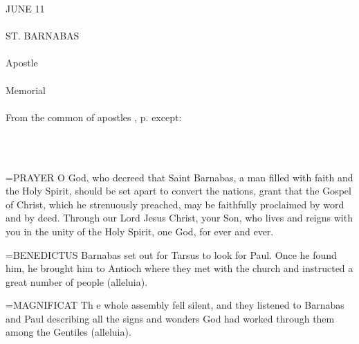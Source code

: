\begin{center}\normalsize \begin{center}\normalsize JUNE 11\\\\
\footnotesize \footnotesize ST. BARNABAS\\\\
\footnotesize \footnotesize Apostle\\\\
\footnotesize \footnotesize Memorial\\\\
\footnotesize \footnotesize From the common of apostles , p.    except:\\\\
\footnotesize \end{center}\\
\end{center}

\hangindent=\parindent \small{PRAYER 
O God, who decreed that Saint Barnabas,
a man filled with faith and the Holy Spirit,
should be set apart to convert the nations,
grant that the Gospel of Christ,
which he strenuously preached,
may be faithfully proclaimed by word and by deed.
Through our Lord Jesus Christ, your Son,
who lives and reigns with you in the unity of the Holy Spirit,
one God, for ever and ever.\\}
 
\hangindent=\parindent \small{BENEDICTUS  Barnabas set out for Tarsus to look for Paul. Once he
found him, he brought him to Antioch where they met with the
church and instructed a great number of people (alleluia).\\}
 
\hangindent=\parindent \small{MAGNIFICAT  Th e whole assembly fell silent, and they listened to
Barnabas and Paul describing all the signs and wonders God had
worked through them among the Gentiles (alleluia).\\}
 
